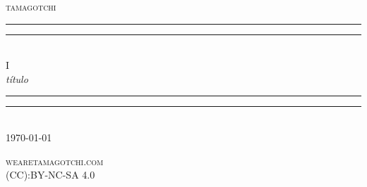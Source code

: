 
\begin{titlepage}
\centering

\settowidth{\unitlength}{\LARGE WE ARE TAMAGOTCHI}

\vspace*{\baselineskip}

{\Large\scshape tamagotchi}\\[\baselineskip]

\rule{\unitlength}{1.6pt}\vspace*{-\baselineskip}\vspace*{2pt}
\rule{\unitlength}{0.4pt}\\[\baselineskip]

{\LARGE I}\\[\baselineskip]

{\itshape título}\\[0.2\baselineskip]

\rule{\unitlength}{0.4pt}\vspace*{-\baselineskip}\vspace{3.2pt}
\rule{\unitlength}{1.6pt}\\[\baselineskip]

{\large\scshape \today}\par

\vfill

{\large\scshape wearetamagotchi.com}\\[\baselineskip]
{\small\scshape (CC):BY-NC-SA 4.0}\par

\end{titlepage}